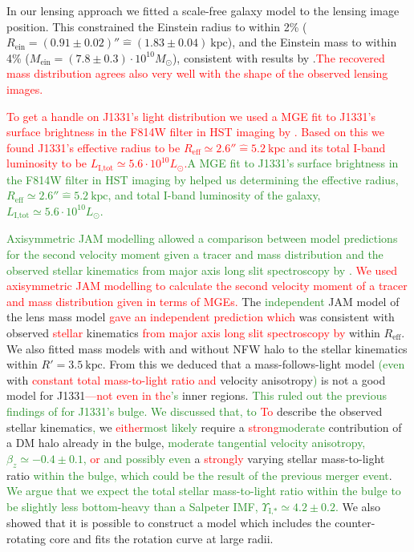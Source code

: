 \documentclass[useAMS,usenatbib]{mnras}
\newcommand{\NEW}[1]{\textcolor{ForestGreen}{#1}}
\newcommand{\OLD}[1]{\textcolor{Red}{#1}}
\begin{document}
In our lensing approach we fitted a scale-free galaxy model to the lensing image position. This constrained the Einstein radius to within 2\% ($R_\text{ein}=(0.91\pm0.02)'' \hat{=}(1.83\pm0.04)~\text{kpc}$), and the Einstein mass to within 4\% ($M_\text{ein} = (7.8\pm0.3) \cdot 10^{10} M_\odot$), consistent with results by \citet{SWELLSIII}.\OLD{The recovered mass distribution agrees also very well with the shape of the observed lensing images.}

\OLD{To get a handle on J1331's light distribution we used a MGE fit to J1331's surface brightness in the F814W filter in HST imaging by \citet{SWELLSI}. Based on this we found J1331's effective radius to be $R_\text{eff} \simeq 2.6'' \hat{=} 5.2~\text{kpc}$ and its total I-band luminosity to be $L_\text{I,tot} \simeq 5.6 \cdot 10^{10} L_\odot$.}\NEW{A MGE fit to J1331's surface brightness in the F814W filter in HST imaging by \citet{SWELLSI} helped us determining the effective radius, $R_\text{eff} \simeq 2.6'' \hat{=} 5.2~\text{kpc}$, and total I-band luminosity of the galaxy, $L_\text{I,tot} \simeq 5.6 \cdot 10^{10} L_\odot$.}

\NEW{Axisymmetric JAM modelling allowed a comparison between model predictions for the second velocity moment given a tracer and mass distribution and the observed stellar kinematics from major axis long slit spectroscopy by \citet{SWELLSV}.} \OLD{We used axisymmetric JAM modelling to calculate the second velocity moment of a tracer and mass distribution given in terms of MGEs.} The \NEW{independent} JAM model of the lens mass model \OLD{gave an independent prediction which }was consistent with observed\OLD{ stellar} kinematics\OLD{ from major axis long slit spectroscopy by \citet{SWELLSV}} within $R_\text{eff}$. We also fitted mass models with and without NFW halo to the stellar kinematics within $R'=3.5~\text{kpc}$. From this we deduced that a mass-follows-light model \NEW{(even} with \OLD{constant total mass-to-light ratio and }velocity anisotropy\NEW{)} is not a good model for J1331\OLD{---not even in the}\NEW{'s} inner regions. \NEW{This ruled out the previous findings of \citet{SWELLSV} for J1331's bulge. We discussed that, to}\OLD{ To} describe the observed stellar kinematics\NEW{,} we \OLD{either}\NEW{most likely} require a \OLD{strong}\NEW{moderate} contribution of a DM halo already in the bulge, \NEW{moderate tangential velocity anisotropy, $\beta_z \simeq -0.4\pm0.1$, }\OLD{or} \NEW{and possibly even} a \OLD{strongly} varying stellar mass-to-light ratio \NEW{within the bulge, which could be the result of the previous merger event}. \NEW{We argue that we expect the total stellar mass-to-light ratio within the bulge to be slightly less bottom-heavy than a Salpeter IMF, $\Upsilon_\text{I,*}\simeq 4.2\pm0.2$.} We also showed that it is possible to construct a model which includes the counter-rotating core and fits the rotation curve at large radii.
\end{document}

